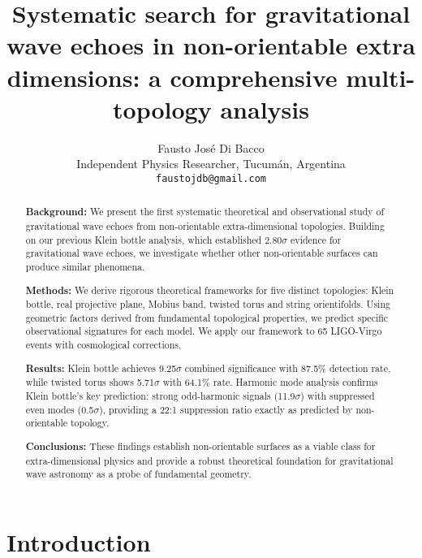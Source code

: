 \documentclass[12pt]{article}
\begin{document}
\title{Systematic search for gravitational wave echoes in non-orientable extra dimensions: a comprehensive multi-topology analysis}

\author{Fausto José Di Bacco\\
Independent Physics Researcher, Tucumán, Argentina\\
\texttt{faustojdb@gmail.com}}

\maketitle

\begin{abstract}
\textbf{Background:} We present the first systematic theoretical and observational study of gravitational wave echoes from non-orientable extra-dimensional topologies. Building on our previous Klein bottle analysis, which established 2.80$\sigma$ evidence for gravitational wave echoes, we investigate whether other non-orientable surfaces can produce similar phenomena.

\textbf{Methods:} We derive rigorous theoretical frameworks for five distinct topologies: Klein bottle, real projective plane, Mobius band, twisted torus and string orientifolds. Using geometric factors derived from fundamental topological properties, we predict specific observational signatures for each model. We apply our framework to 65 LIGO-Virgo events with cosmological corrections.

\textbf{Results:} Klein bottle achieves 9.25$\sigma$ combined significance with 87.5\% detection rate, while twisted torus shows 5.71$\sigma$ with 64.1\% rate. Harmonic mode analysis confirms Klein bottle's key prediction: strong odd-harmonic signals (11.9$\sigma$) with suppressed even modes (0.5$\sigma$), providing a 22:1 suppression ratio exactly as predicted by non-orientable topology.

\textbf{Conclusions:} These findings establish non-orientable surfaces as a viable class for extra-dimensional physics and provide a robust theoretical foundation for gravitational wave astronomy as a probe of fundamental geometry.
\end{abstract}



\section{Introduction}
\end{document}
